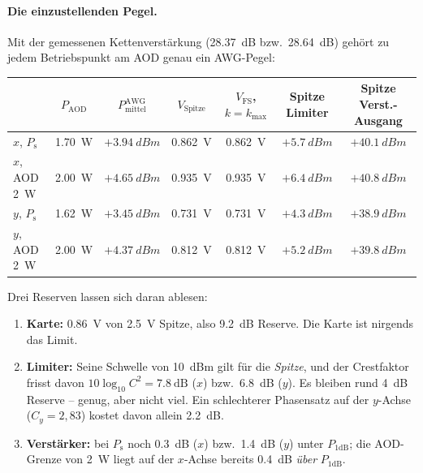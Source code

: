 \documentclass[11pt,a4paper]{article}
\newcommand{\crest}{\ensuremath{C}}
\begin{document}
\paragraph{Die einzustellenden Pegel.}
Mit der gemessenen Kettenverstärkung (\SI{28.37}{\deci\bel} bzw.\
\SI{28.64}{\deci\bel}) gehört zu jedem Betriebspunkt am AOD genau ein
AWG-Pegel:
\begin{center}
\small
\begin{tabular}{@{}lcccccc@{}}
  \toprule
  & $P_\mathrm{AOD}$ & $P^\mathrm{AWG}_\mathrm{mittel}$ & $V_\mathrm{Spitze}$
  & $V_\mathrm{FS}$, $k=k_\mathrm{max}$ & Spitze Limiter & Spitze Verst.-Ausgang\\
  \midrule
  $x$, $P_\mathrm{s}$      & \SI{1.70}{\watt} & $+\SI{3.94}{dBm}$ & \SI{0.862}{\volt} & \SI{0.862}{\volt} & $+\SI{5.7}{dBm}$ & $+\SI{40.1}{dBm}$\\
  $x$, AOD \SI{2}{\watt}   & \SI{2.00}{\watt} & $+\SI{4.65}{dBm}$ & \SI{0.935}{\volt} & \SI{0.935}{\volt} & $+\SI{6.4}{dBm}$ & $+\SI{40.8}{dBm}$\\
  $y$, $P_\mathrm{s}$      & \SI{1.62}{\watt} & $+\SI{3.45}{dBm}$ & \SI{0.731}{\volt} & \SI{0.731}{\volt} & $+\SI{4.3}{dBm}$ & $+\SI{38.9}{dBm}$\\
  $y$, AOD \SI{2}{\watt}   & \SI{2.00}{\watt} & $+\SI{4.37}{dBm}$ & \SI{0.812}{\volt} & \SI{0.812}{\volt} & $+\SI{5.2}{dBm}$ & $+\SI{39.8}{dBm}$\\
  \bottomrule
\end{tabular}
\end{center}
Drei Reserven lassen sich daran ablesen:
\begin{enumerate}\itemsep0.15em
  \item \textbf{Karte:} \SI{0.86}{\volt} von \SI{2.5}{\volt} Spitze, also
        \SI{9.2}{\deci\bel} Reserve. Die Karte ist nirgends das Limit.
  \item \textbf{Limiter:} Seine Schwelle von \SI{10}{dBm} gilt für die
        \emph{Spitze}, und der Crestfaktor frisst davon
        $10\log_{10}\crest^2 = \SI{7.8}{\deci\bel}$ ($x$) bzw.\
        \SI{6.8}{\deci\bel} ($y$). Es bleiben rund \SI{4}{\deci\bel}
        Reserve -- genug, aber nicht viel. Ein schlechterer Phasensatz auf
        der $y$-Achse ($\crest_y=2{,}83$) kostet davon allein
        \SI{2.2}{\deci\bel}.
  \item \textbf{Verstärker:} bei $P_\mathrm{s}$ noch \SI{0.3}{\deci\bel}
        ($x$) bzw.\ \SI{1.4}{\deci\bel} ($y$) unter $P_{1\mathrm{dB}}$; die
        AOD-Grenze von \SI{2}{\watt} liegt auf der $x$-Achse bereits
        \SI{0.4}{\deci\bel} \emph{über} $P_{1\mathrm{dB}}$.
\end{enumerate}
\end{document}
